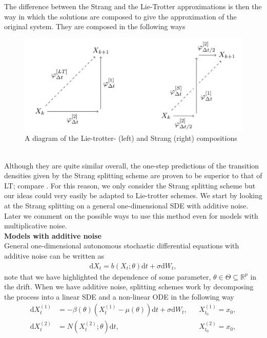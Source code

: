 The difference between the Strang and the Lie-Trotter approximations is then the way in which the solutions are composed to give the approximation of the original system. They are composed in the following ways
\begin{figure}[h!]
    \begin{center}
    \includegraphics[scale = .185]{figures/strangAndLieTrotter.jpeg}
    \end{center}
    \caption{A diagram of the Lie-trotter- (left) and Strang (right) compositions}
    \label{figure:StrangAndLieTrotterPlot}
\end{figure}\\
Although they are quite similar overall, the one-step predictions of the transition densities given by the Strang splitting scheme are proven to be superior to that of LT; compare \cite[Proposition 3.4 and 3.6]{SplittingSchemes}. For this reason, we only consider the Strang splitting scheme but our ideas could very easily be adapted to Lie-trotter schemes. We start by looking at the Strang splitting on a general one-dimensional SDE with additive noise. Later we comment on the possible ways to use this method even for models with multiplicative noise.\\
\textbf{Models with additive noise}\\
General one-dimensional autonomous stochastic differential equations with additive noise can be written as
\begin{align}
    \mathrm{d}X_t = b(X_t; \theta)\mathrm{d}t + \sigma\mathrm{d}W_t, \label{eq:generalAdditiveNoiseSDE}
\end{align}
note that we have highlighted the dependence of some parameter, $\theta\in\Theta\subseteq\mathbb{R}^p$ in the drift. When we have additive noise, splitting schemes work by decomposing the process into a linear SDE and a non-linear ODE in the following way
\begin{align}
    \mathrm{d}X_t^{(1)} &= -\beta(\theta)\left(X_t^{(1)} - \mu(\theta)\right)\mathrm{d}t + \sigma \mathrm{d}W_t, &&X_{t_0}^{(1)} = x_0, \label{SDE_split}\\
    \mathrm{d}X_t^{(2)} &= N\left(X_t^{(2)}; \theta\right)\mathrm{d}t, &&X_{t_0}^{(2)} = x_0, \label{ODE_Split}
\end{align}
